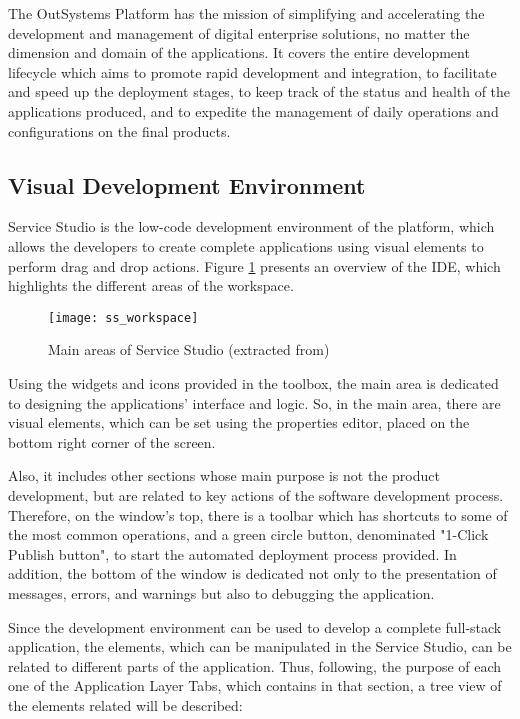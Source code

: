 The OutSystems Platform has the mission of simplifying and accelerating the development and management of digital enterprise solutions, no matter the dimension and domain of the applications. It covers the entire development lifecycle which aims to promote rapid development and integration, to facilitate and speed up the deployment stages, to keep track of the status and health of the applications produced, and to expedite the management of daily operations and configurations on the final products. \cite{eg_developingWithOutsystems}

\subsection{Visual Development Environment}
\label{subsec:visual_development_environment}

Service Studio is the low-code development environment of the platform, which allows the developers to create complete applications using visual elements to perform drag and drop actions. Figure \ref{fig:ss_workspace} presents an overview of the IDE, which highlights the different areas of the workspace.

\begin{figure}[htbp]
	\centering
	\texttt{[image: ss\_workspace]}
	\caption{Main areas of Service Studio (extracted from\cite{serviceStudioOverview})}
	\label{fig:ss_workspace}
\end{figure}

Using the widgets and icons provided in the toolbox, the main area is dedicated to designing the applications’ interface and logic. So, in the main area, there are visual elements, which can be set using the properties editor, placed on the bottom right corner of the screen. 

Also, it includes other sections whose main purpose is not the product development, but are related to key actions of the software development process. Therefore, on the window’s top, there is a toolbar which has shortcuts to some of the most common operations, and a green circle button, denominated "1-Click Publish button", to start the automated deployment process provided. In addition, the bottom of the window is dedicated not only to the presentation of messages, errors, and warnings but also to debugging the application.

Since the development environment can be used to develop a complete full-stack application, the elements, which can be manipulated in the Service Studio, can be related to different parts of the application. Thus, following, the purpose of each one of the Application Layer Tabs, which contains in that section, a tree view of the elements related will be described:

